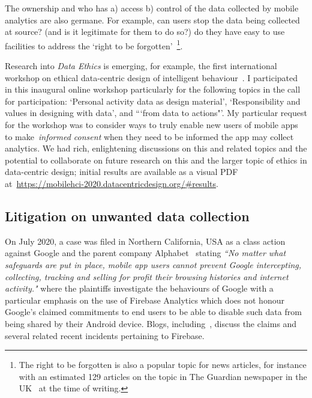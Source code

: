 The ownership and who has a) access b) control of the data collected by mobile analytics are also germane. For example, can users stop the data being collected at source? (and is it legitimate for them to do so?) do they have easy to use facilities to address the `right to be forgotten'~\citep{gdpr_article_17_right_to_erasure}\footnote{The right to be forgotten is also a popular topic for news articles, for instance with an estimated 129 articles on the topic in The Guardian newspaper in the UK~\citep{guardiannewspaper_right_to_be_forgotten_articles} at the time of writing.}. 

Research into \emph{Data Ethics} is emerging, for example, the first international workshop on ethical data-centric design of intelligent behaviour~\citep{datethics2020_workshop}. I participated in this inaugural online workshop particularly for the following topics in the call for participation: `Personal activity data as design material', `Responsibility and values in designing with data', and ```from data to actions"'. My particular request for the workshop was to consider ways to truly enable new users of mobile apps to make~\emph{informed consent} when they need to be informed the app may collect analytics. We had rich, enlightening discussions on this and related topics and the potential to collaborate on future research on this and the larger topic of ethics in data-centric design; initial results are available as a visual PDF at~\url{https://mobilehci-2020.datacentricdesign.org/#results}.

\subsection{Litigation on unwanted data collection}
On  July 2020, a case was filed in Northern California, USA as a class action against Google and the parent company Alphabet~\cite{rodriguez_et_al_v_google_llc_et_al_2020} stating \emph{``No matter what safeguards are put in place, mobile app users cannot prevent Google intercepting, collecting, tracking and selling for profit their browsing histories and internet activity."} where the plaintiffs investigate the behaviours of Google with a particular emphasis on the use of Firebase Analytics which does not honour Google's claimed commitments to end users to be able to disable such data from being shared by their Android device. Blogs, including~\cite{winder2020_forbes_on_the_class_action_firebase_analytics}, discuss the claims and several related recent incidents pertaining to Firebase.

